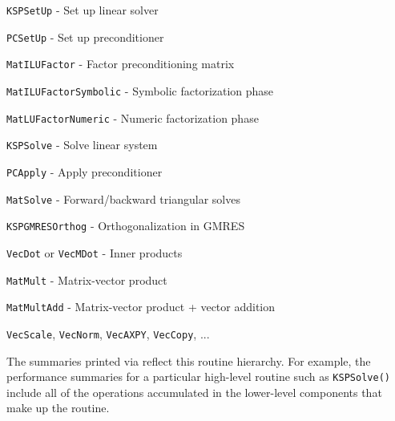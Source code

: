 \begin{tightitemize}
  \item \lstinline{KSPSetUp} - Set up linear solver
   \begin{tightitemize}
     \item \lstinline{PCSetUp} - Set up preconditioner
    \begin{tightitemize}
      \item \lstinline{MatILUFactor} - Factor preconditioning matrix
      \begin{tightitemize}
        \item \lstinline{MatILUFactorSymbolic} - Symbolic factorization phase
        \item \lstinline{MatLUFactorNumeric} - Numeric factorization phase
      \end{tightitemize}
    \end{tightitemize}
\end{tightitemize}
 \item \lstinline{KSPSolve} - Solve linear system
   \begin{tightitemize}
     \item \lstinline{PCApply} - Apply preconditioner
    \begin{tightitemize}
      \item \lstinline{MatSolve} - Forward/backward triangular solves
    \end{tightitemize}
  \item \lstinline{KSPGMRESOrthog} - Orthogonalization in GMRES
    \begin{tightitemize}
      \item \lstinline{VecDot} or \lstinline{VecMDot} - Inner products
    \end{tightitemize}
  \item \lstinline{MatMult} - Matrix-vector product
  \item \lstinline{MatMultAdd} - Matrix-vector product + vector addition
    \begin{tightitemize}
      \item \lstinline{VecScale}, \lstinline{VecNorm}, \lstinline{VecAXPY}, \lstinline{VecCopy}, ...
    \end{tightitemize}
  \end{tightitemize}
\end{tightitemize}

The summaries printed via  reflect this
routine hierarchy. For example, the performance summaries for a
particular high-level routine such as \lstinline{KSPSolve()} include all of
the operations accumulated in the lower-level components that
make up the routine.

